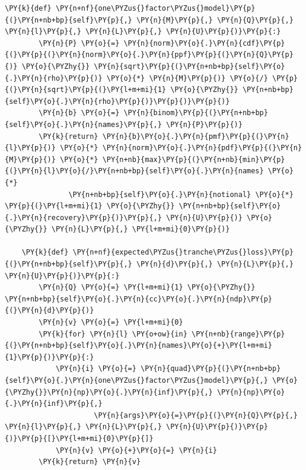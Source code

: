 \begin{codebox}
\begin{Verbatim}[commandchars=\\\{\}]
    \PY{k}{def} \PY{n+nf}{one\PYZus{}factor\PYZus{}model}\PY{p}{(}\PY{n+nb+bp}{self}\PY{p}{,} \PY{n}{M}\PY{p}{,} \PY{n}{Q}\PY{p}{,} \PY{n}{l}\PY{p}{,} \PY{n}{L}\PY{p}{,} \PY{n}{U}\PY{p}{)}\PY{p}{:}
        \PY{n}{P} \PY{o}{=} \PY{n}{norm}\PY{o}{.}\PY{n}{cdf}\PY{p}{(}\PY{p}{(}\PY{n}{norm}\PY{o}{.}\PY{n}{ppf}\PY{p}{(}\PY{n}{Q}\PY{p}{)} \PY{o}{\PYZhy{}} \PY{n}{sqrt}\PY{p}{(}\PY{n+nb+bp}{self}\PY{o}{.}\PY{n}{rho}\PY{p}{)} \PY{o}{*} \PY{n}{M}\PY{p}{)} \PY{o}{/} \PY{p}{(}\PY{n}{sqrt}\PY{p}{(}\PY{l+m+mi}{1} \PY{o}{\PYZhy{}} \PY{n+nb+bp}{self}\PY{o}{.}\PY{n}{rho}\PY{p}{)}\PY{p}{)}\PY{p}{)}
        \PY{n}{b} \PY{o}{=} \PY{n}{binom}\PY{p}{(}\PY{n+nb+bp}{self}\PY{o}{.}\PY{n}{names}\PY{p}{,} \PY{n}{P}\PY{p}{)}
        \PY{k}{return} \PY{n}{b}\PY{o}{.}\PY{n}{pmf}\PY{p}{(}\PY{n}{l}\PY{p}{)} \PY{o}{*} \PY{n}{norm}\PY{o}{.}\PY{n}{pdf}\PY{p}{(}\PY{n}{M}\PY{p}{)} \PY{o}{*} \PY{n+nb}{max}\PY{p}{(}\PY{n+nb}{min}\PY{p}{(}\PY{n}{l}\PY{o}{/}\PY{n+nb+bp}{self}\PY{o}{.}\PY{n}{names} \PY{o}{*} 
               \PY{n+nb+bp}{self}\PY{o}{.}\PY{n}{notional} \PY{o}{*} \PY{p}{(}\PY{l+m+mi}{1} \PY{o}{\PYZhy{}} \PY{n+nb+bp}{self}\PY{o}{.}\PY{n}{recovery}\PY{p}{)}\PY{p}{,} \PY{n}{U}\PY{p}{)} \PY{o}{\PYZhy{}} \PY{n}{L}\PY{p}{,} \PY{l+m+mi}{0}\PY{p}{)}
	
    \PY{k}{def} \PY{n+nf}{expected\PYZus{}tranche\PYZus{}loss}\PY{p}{(}\PY{n+nb+bp}{self}\PY{p}{,} \PY{n}{d}\PY{p}{,} \PY{n}{L}\PY{p}{,} \PY{n}{U}\PY{p}{)}\PY{p}{:}
        \PY{n}{Q} \PY{o}{=} \PY{l+m+mi}{1} \PY{o}{\PYZhy{}} \PY{n+nb+bp}{self}\PY{o}{.}\PY{n}{cc}\PY{o}{.}\PY{n}{ndp}\PY{p}{(}\PY{n}{d}\PY{p}{)}
        \PY{n}{v} \PY{o}{=} \PY{l+m+mi}{0}
        \PY{k}{for} \PY{n}{l} \PY{o+ow}{in} \PY{n+nb}{range}\PY{p}{(}\PY{n+nb+bp}{self}\PY{o}{.}\PY{n}{names}\PY{o}{+}\PY{l+m+mi}{1}\PY{p}{)}\PY{p}{:}
            \PY{n}{i} \PY{o}{=} \PY{n}{quad}\PY{p}{(}\PY{n+nb+bp}{self}\PY{o}{.}\PY{n}{one\PYZus{}factor\PYZus{}model}\PY{p}{,} \PY{o}{\PYZhy{}}\PY{n}{np}\PY{o}{.}\PY{n}{inf}\PY{p}{,} \PY{n}{np}\PY{o}{.}\PY{n}{inf}\PY{p}{,} 
                     \PY{n}{args}\PY{o}{=}\PY{p}{(}\PY{n}{Q}\PY{p}{,} \PY{n}{l}\PY{p}{,} \PY{n}{L}\PY{p}{,} \PY{n}{U}\PY{p}{)}\PY{p}{)}\PY{p}{[}\PY{l+m+mi}{0}\PY{p}{]}
            \PY{n}{v} \PY{o}{+}\PY{o}{=} \PY{n}{i}
        \PY{k}{return} \PY{n}{v}
	

\end{Verbatim}
\end{codebox}
